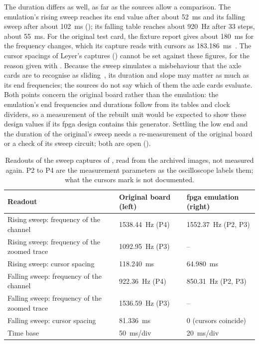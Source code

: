 The duration differs as well, as far as the sources allow a comparison. The emulation's rising sweep reaches its end value after about \SI{52}{\milli\second} and its falling sweep after about \SI{102}{\milli\second} (); its falling table reaches about \SI{920}{\hertz} after 33 steps, about \SI{55}{\milli\second}. For the original test card, the fixture report gives about \SI{180}{\milli\second} for the frequency changes, which its capture reads with cursors as \SI{183.186}{\milli\second}~\cite[Sec.~5.2, Fig.~3]{dolata2023}. The cursor spacings of Leyer's captures () cannot be set against these figures, for the reason given with . Because the sweep simulates a misbehaviour that the axle cards are to recognise as sliding~\cite[Sec.~2.9]{leyer2023}, its duration and slope may matter as much as its end frequencies; the sources do not say which of them the axle cards evaluate. Both points concern the original board rather than the emulation: the emulation's end frequencies and durations follow from its tables and clock dividers, so a measurement of the rebuilt unit would be expected to show these design values if its \gls{fpga} design contains this generator. Settling the low end and the duration of the original's sweep needs a re-measurement of the original board or a check of its sweep circuit; both are open ().

\begin{table}[htbp]
	\centering
	\caption[Readouts of the Sweep Captures]{Readouts of the sweep captures of , read from the archived images, not measured again. P2 to P4 are the measurement parameters as the oscilloscope labels them; what the cursors mark is not documented.}
	\label{tab:sweep_readouts}
	\small
	\begin{tabular}{@{}lll@{}}
		\toprule
		Readout & Original board (left) & \gls{fpga} emulation (right) \\
		\midrule
		Rising sweep: frequency of the channel & \SI{1538.44}{\hertz} (P4) & \SI{1552.37}{\hertz} (P2, P3) \\
		Rising sweep: frequency of the zoomed trace & \SI{1092.95}{\hertz} (P3) & -- \\
		Rising sweep: cursor spacing & \SI{118.240}{\milli\second} & \SI{64.980}{\milli\second} \\
		Falling sweep: frequency of the channel & \SI{922.36}{\hertz} (P4) & \SI{850.31}{\hertz} (P2, P3) \\
		Falling sweep: frequency of the zoomed trace & \SI{1536.59}{\hertz} (P3) & -- \\
		Falling sweep: cursor spacing & \SI{81.336}{\milli\second} & 0 (cursors coincide) \\
		Time base & \SI{50}{\milli\second}/div & \SI{20}{\milli\second}/div \\
		\bottomrule
	\end{tabular}
\end{table}

